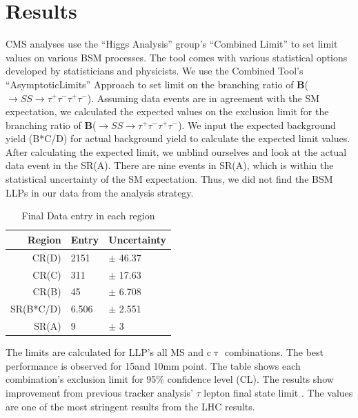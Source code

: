 \clearpage
\chapter{Results}\label{sec:results}
CMS analyses use the ``Higgs Analysis'' group's ``Combined Limit'' to set limit values on various BSM processes.
The tool comes with various statistical options developed by statisticians and physicists.
We use the Combined Tool's ``AsymptoticLimits'' Approach to set limit on the branching ratio of \textbf{B}(\PH$\to SS \to \tau^{+}\tau^{-}\tau^{+}\tau^{-}$).
Assuming data events are in agreement with the SM expectation, we calculated the expected values on the exclusion limit for the branching ratio of \textbf{B}(\PH$\to SS \to \tau^{+}\tau^{-}\tau^{+}\tau^{-}$).
We input the expected background yield (B*C/D) for actual background yield to calculate the expected limit values.
After calculating the expected limit, we unblind ourselves and look at the actual data event in the SR(A).
There are nine events in SR(A), which is within the statistical uncertainty of the SM expectation.
Thus, we did not find the BSM LLPs in our data from the analysis strategy.
\begin{table}[htb]
\caption{Final Data entry in each region}
\begin{center}
\begin{tabular}{r|l|l}\hline
	Region & Entry & Uncertainty \\
 \hline
	CR(D) & 2151 & $\pm$ 46.37 \\
 \hline
	CR(C) & 311 & $\pm$ 17.63\\
 \hline
	CR(B) & 45 & $\pm$ 6.708\\
 \hline
	SR(B*C/D) & 6.506 & $\pm$ 2.551\\
 \hline
	SR(A) & 9 & $\pm$ 3 \\
 \hline
\end{tabular}
\label{tab:unblind}
\end{center}
\end{table}

The limits are calculated for LLP's all MS and c$\uptau$ combinations.
The best performance is observed for 15\GeV and 10mm point.
The table shows each combination's exclusion limit for 95\% confidence level (CL).
The results show improvement from previous tracker analysis' $\tau$ lepton final state limit \cite{ZHAN}.
The values are one of the most stringent results from the LHC results.

